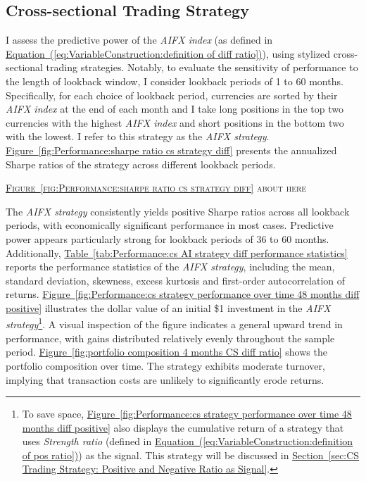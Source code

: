 \documentclass[12pt,oneside,letter]{article}
\newcommand*{\mytab}[1]{\hyperref[{#1}]{Table~\ref*{#1}}}
\newcommand*{\myfig}[1]{\hyperref[{#1}]{Figure~\ref*{#1}}}
\newcommand*{\mysec}[1]{\hyperref[{#1}]{Section~\ref*{#1}}}
\newcommand*{\myeq}[1]{\hyperref[{#1}]{Equation~(\ref*{#1})}}
\begin{document}
		\subsection{Cross-sectional Trading Strategy}  \label{sec:Cross Sectional Trading Strategy: Diff Ratio as the signal}
		I assess the predictive power of the \textit{AIFX index} (as defined in \myeq{eq:VariableConstruction:definition of diff ratio}), using stylized cross-sectional trading strategies. Notably, to evaluate the sensitivity of performance to the length of lookback window, I consider lookback periods of 1 to 60 months. Specifically, for each choice of lookback period, currencies are sorted by their \textit{AIFX index} at the end of each month and I take long positions in the top two currencies with the highest \textit{AIFX index} and short positions in the bottom two with the lowest. I refer to this strategy as the \textit{AIFX strategy}. \myfig{fig:Performance:sharpe ratio cs strategy diff} presents the annualized Sharpe ratios of the strategy across different lookback periods.
		\begin{center}
			\textsc{\myfig{fig:Performance:sharpe ratio cs strategy diff} about here} 
		\end{center}
		 The \textit{AIFX strategy} consistently yields positive Sharpe ratios across all lookback periods, with economically significant performance in most cases. Predictive power appears particularly strong for lookback periods of 36 to 60 months. Additionally, \mytab{tab:Performance:cs AI strategy diff performance statistics} reports the performance statistics of the \textit{AIFX strategy}, including the mean, standard deviation, skewness, excess kurtosis and first-order autocorrelation of returns. \myfig{fig:Performance:cs strategy performance over time 48 months diff positive} illustrates the dollar value of an initial \$1 investment in the \textit{AIFX strategy}\footnote{To save space, \myfig{fig:Performance:cs strategy performance over time 48 months diff positive} also displays the cumulative return of a strategy that uses \textit{Strength ratio} (defined in \myeq{eq:VariableConstruction:definition of pos ratio}) as the signal. This strategy will be discussed in \mysec{sec:CS Trading Strategy: Positive and Negative Ratio as Signal}.}. A visual inspection of the figure indicates a general upward trend in performance, with gains distributed relatively evenly throughout the sample period. \myfig{fig:portfolio composition 4 months CS diff ratio} shows the portfolio composition over time. The strategy exhibits moderate turnover, implying that transaction costs are unlikely to significantly erode returns.
\end{document}
